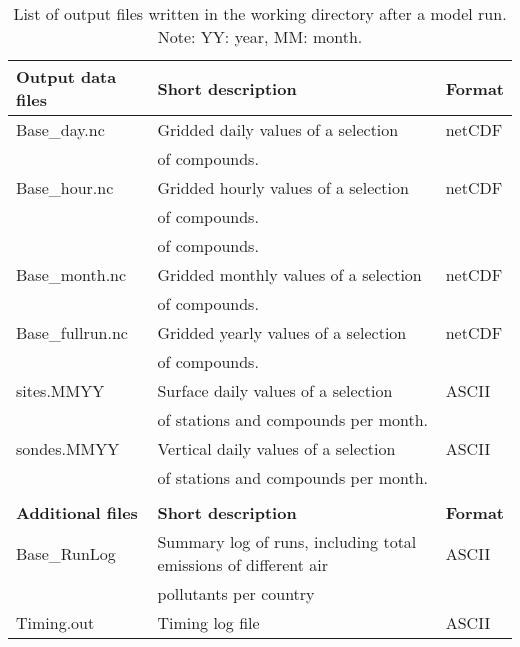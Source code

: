 \begin{table}[h!]
\caption[List of model output files]{List of output files written in the
  working directory after a  model run. 
Note: YY: year, MM: month.}\label{tab:output}
\begin{center}
\hspace{-1cm}
\begin{tabular}{lll}
\hline
{\bf Output data files} &  {\bf Short description} & {\bf Format}\\
\hline
    Base\_day.nc & Gridded daily values of a selection & netCDF\\
&   of compounds.& \\ 
    Base\_hour.nc &Gridded hourly values of a selection &
    netCDF\\  
 &  of compounds.& \\
 &  of compounds.& \\
    Base\_month.nc & Gridded monthly values of a selection&
    netCDF\\
 &  of compounds.& \\
    Base\_fullrun.nc & Gridded yearly values of a selection&
    netCDF\\
 &  of compounds. & \\
    sites.MMYY & Surface daily values of a selection&  ASCII\\
 & of stations and compounds per month.& \\
    sondes.MMYY & Vertical daily values of a selection& ASCII\\
 &  of stations and compounds per month.& \\
& &\\ \hline
{\bf Additional files} &  {\bf Short description} & {\bf Format}\\
    Base\_RunLog & Summary log of runs, including total emissions of different air   & ASCII\\
 & pollutants per country& \\
Timing.out & Timing log file& ASCII \\
 
\hline
\end{tabular}
\end{center}

\label{Tab:outputs}
\end{table}


